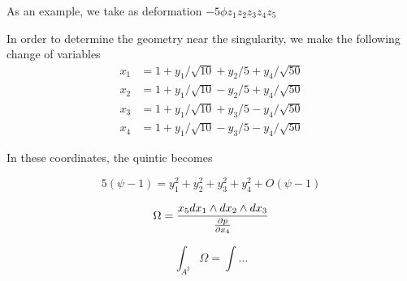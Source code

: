 As an example, we take as deformation $-5\phi z_1 z_2 z_3 z_4 z_5$




In order to determine the geometry near the singularity, we make the following change of 
variables
\begin{equation}
  \begin{align}
  x_1 &= 1 + y_1/\sqrt{10} + y_2/5 + y_4/\sqrt{50}\\
  x_2 &= 1 + y_1/\sqrt{10} - y_2/5 + y_4/\sqrt{50}\\
  x_3 &= 1 + y_1/\sqrt{10} + y_3/5 - y_4/\sqrt{50}\\
  x_4 &= 1 + y_1/\sqrt{10} - y_3/5 - y_4/\sqrt{50}
  \end{align}
\end{equation}

In these coordinates, the quintic becomes

\begin{equation}
  5(\psi -1 ) =  y_1^2 + y_2^2 + y_3^2 + y_4^2 + O( \psi -1 )
\end{equation}






\begin{equation}
  \Omega = \frac{x_5 dx_1 \wedge dx_2\wedge dx_3}{\pdv{p}{x_4}}
\end{equation}


\begin{equation}
  \int_{A^2} \Omega = \int  \dots
\end{equation}








